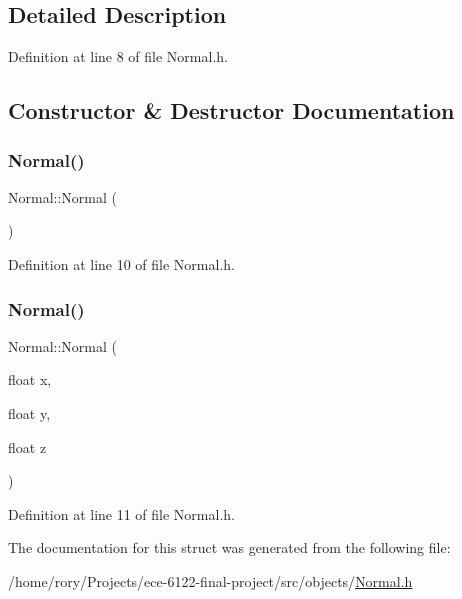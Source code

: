 \subsection{Detailed Description}


Definition at line 8 of file Normal.\+h.



\subsection{Constructor \& Destructor Documentation}
\mbox{\label{struct_normal_af62e51ec40dc2eedc3b9ca49ebdc7197}} 
\subsubsection{\texorpdfstring{Normal()}{Normal()}\hspace{0.1cm}{\footnotesize\ttfamily [1/2]}}
{\footnotesize\ttfamily Normal\+::\+Normal (\begin{DoxyParamCaption}{ }\end{DoxyParamCaption})\hspace{0.3cm}{\ttfamily [inline]}}



Definition at line 10 of file Normal.\+h.

\mbox{\label{struct_normal_acf08fa0dafb56ea445b20c882a503292}} 
\subsubsection{\texorpdfstring{Normal()}{Normal()}\hspace{0.1cm}{\footnotesize\ttfamily [2/2]}}
{\footnotesize\ttfamily Normal\+::\+Normal (\begin{DoxyParamCaption}\item[{float}]{x,  }\item[{float}]{y,  }\item[{float}]{z }\end{DoxyParamCaption})\hspace{0.3cm}{\ttfamily [inline]}}



Definition at line 11 of file Normal.\+h.



The documentation for this struct was generated from the following file\+:\begin{DoxyCompactItemize}
\item 
/home/rory/\+Projects/ece-\/6122-\/final-\/project/src/objects/\hyperlink{_normal_8h}{Normal.\+h}\end{DoxyCompactItemize}
